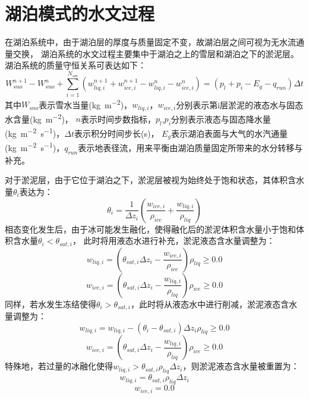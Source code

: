 \section{湖泊模式的水文过程}\label{湖泊水文}
在湖泊系统中，由于湖泊层的厚度与质量固定不变，故湖泊层之间可视为无水流通量交换，
湖泊系统的水文过程主要集中于湖泊之上的雪层和湖泊之下的淤泥层。
湖泊系统的质量守恒关系可表达如下：
\begin{equation}
W_{sno}^{n+1}-W_{sno}^{n}+\sum_{i=1}^{N_{s o i}}\left(w_{liq, i}^{n+1}+w_{ice, i}^{n+1}-w_{liq, i}^{n}-w_{ice, i}^{n}\right)=\left(p_{l}+p_{i}-E_{g}-q_{r u n}\right) \Delta t
\end{equation}
其中$W_{sno}$表示雪水当量(\unit{kg.m^{-2}})，$w_{liq,i}$，$w_{ice,i}$分别表示第i层淤泥的液态水与固态水含量(\unit{kg.m^{-2}})，
$n$表示时间步数指标，$p_l$,$p_i$分别表示液态与固态降水量(\unit{kg.m^{-2}.s^{-1}})，$\Delta t$表示积分时间步长(s)，
$E_g$表示湖泊表面与大气的水汽通量(\unit{kg.m^{-2}.s^{-1}})，$q_{run}$表示地表径流，用来平衡由湖泊质量固定所带来的水分转移与补充。


对于淤泥层，由于它位于湖泊之下，淤泥层被视为始终处于饱和状态，其体积含水量$\theta_i$表达为：
\begin{equation}
\theta_{i}=\frac{1}{\Delta z_{i}}\left(\frac{w_{ice, i}}{\rho_{ice}}+\frac{w_{liq, i}}{\rho_{liq}}\right)
\end{equation}
相态变化发生后，由于冰可能发生融化，使得融化后的淤泥体积含水量小于饱和体积含水量$\theta_i<\theta_{sat,i}$，
此时将用液态水进行补充，淤泥液态含水量调整为：
\begin{equation}
w_{liq, i}=\left(\theta_{sat,i} \Delta z_{i}-\frac{w_{ice, i}}{\rho_{ice}}\right) \rho_{liq} \geqslant 0.0
\end{equation}
\begin{equation}
w_{ice, i}=\left(\theta_{sat,i} \Delta z_{i}-\frac{w_{liq, i}}{\rho_{liq}}\right) \rho_{ice} \geqslant 0.0
\end{equation}
同样，若水发生冻结使得$\theta_i>\theta_{sat,i}$，此时将从液态水中进行削减，淤泥液态含水量调整为：
\begin{equation}
w_{liq, i}=w_{liq, i}-\left(\theta_{i}-\theta_{sat,i}\right) \Delta z_{i} \rho_{liq} \geqslant 0.0
\end{equation}
\begin{equation}
w_{ice, i}=\left(\theta_{sat,i} \Delta z_{i}-\frac{w_{liq, i}}{\rho_{liq}}\right) \rho_{ice} \geqslant 0.0
\end{equation}
特殊地，若过量的冰融化使得$w_{liq,i}>\theta_{sat,i}\rho_{liq}\Delta z_i$，则淤泥液态含水量被重置为：
\begin{equation}
w_{liq, i}=\theta_{sat,i} \rho_{liq} \Delta z_{i}
\end{equation}
\begin{equation}
w_{ice, i}=0.0
\end{equation}

